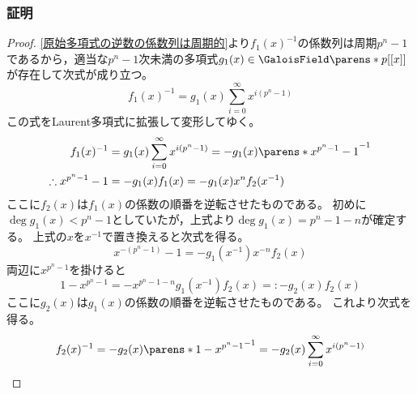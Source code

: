             \subsubsection{証明}
                \begin{proof}
                    \ref{原始多項式の逆数の係数列は周期的}より$f_1(x)^{-1}$の係数列は周期$p^n-1$であるから，適当な$p^n-1$次未満の多項式$g_1(x) \in \GaloisField\parens*{p}[[x]]$が存在して次式が成り立つ。
                    \[ f_1(x)^{-1} = g_1(x) \sum_{i=0}^\infty x^{i(p^n-1)} \]
                    この式をLaurent多項式に拡張して変形してゆく。
                    \begin{align*}
                        f_1(x)^{-1} &= g_1(x) \sum_{i=0}^\infty x^{i(p^n-1)} = -g_1(x) \parens*{x^{p^n-1} - 1}^{-1} \\
                        \therefore x^{p^n-1} - 1 &= -g_1(x)f_1(x) = -g_1(x) x^n f_2(x^{-1})
                    \end{align*}
                    ここに$f_2(x)$は$f_1(x)$の係数の順番を逆転させたものである。
                    初めに$\deg g_1(x) < p^n-1$としていたが，上式より$\deg g_1(x) = p^n-1-n$が確定する。
                    上式の$x$を$x^{-1}$で置き換えると次式を得る。
                    \[ x^{-(p^n-1)} - 1 = -g_1(x^{-1}) x^{-n} f_2(x) \]
                    両辺に$x^{p^n-1}$を掛けると
                    \[ 1 - x^{p^n-1} = -x^{p^n-1-n}g_1(x^{-1}) f_2(x) =: -g_2(x)f_2(x) \]
                    ここに$g_2(x)$は$g_1(x)$の係数の順番を逆転させたものである。
                    これより次式を得る。
                    \[ f_2(x)^{-1} = -g_2(x) \parens*{1 - x^{p^n-1}}^{-1} = -g_2(x) \sum_{i=0}^\infty x^{i(p^n-1)} \]
                \end{proof}

